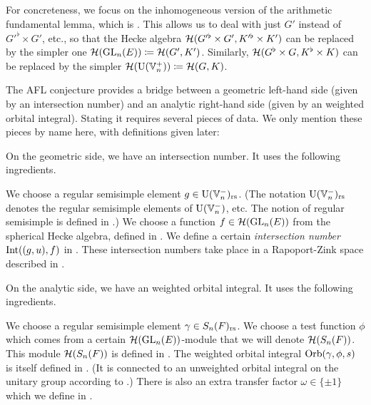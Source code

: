 For concreteness, we focus on the inhomogeneous version
of the arithmetic fundamental lemma, which is \cite[Conjecture 6.2.1]{ref:AFLspherical}.
This allows us to deal with just $G'$ instead of $G'^\flat \times G'$, etc.,
so that the Hecke algebra $\mathcal H(G'^\flat \times G', K'^\flat \times K')$
can be replaced by the simpler one $\mathcal H(\operatorname{GL}_n(E)) \coloneqq \mathcal H(G', K')$.
Similarly, $\mathcal H(G^\flat \times G, K^\flat \times K)$
can be replaced by the simpler $\mathcal H(\operatorname{U}(\mathbb V_n^+)) \coloneqq \mathcal H(G, K)$.

The AFL conjecture provides a bridge between a geometric left-hand side
(given by an intersection number)
and an analytic right-hand side (given by an weighted orbital integral).
Stating it requires several pieces of data.
We only mention these pieces by name here, with definitions given later:
\begin{itemize}
  \ii On the geometric side, we have an intersection number.
  It uses the following ingredients.
  \begin{itemize}
    \ii We choose a regular semisimple element $g \in \operatorname{U}(\mathbb V_n^-)_{\mathrm{rs}}$.
    (The notation $\operatorname{U}(\mathbb V_n^-)_{\mathrm{rs}}$ denotes the regular semisimple elements of $\operatorname{U}(\mathbb V_n^-)$, etc.
    The notion of regular semisimple is defined in .)
    \ii We choose a function $f \in \mathcal H(\operatorname{GL}_n(E))$ from the spherical Hecke algebra,
    defined in .
    \ii We define a certain \emph{intersection number} $\operatorname{Int}((g,u), f)$
    in .
    These intersection numbers take place in a Rapoport-Zink space
    described in .
  \end{itemize}

  \ii On the analytic side, we have an weighted orbital integral.
  It uses the following ingredients.
  \begin{itemize}
    \ii We choose a regular semisimple element $\gamma \in S_n(F)_{\mathrm{rs}}$.
    \ii We choose a test function $\phi$ which comes
    from a certain $\mathcal H(\operatorname{GL}_n(E))$-module that we will denote $\mathcal H(S_n(F))$.
    This module $\mathcal H(S_n(F))$ is defined in .
    \ii The weighted orbital integral $\operatorname{Orb}(\gamma, \phi, s)$
    is itself defined in .
    (It is connected to an unweighted orbital integral on the unitary group
    according to .)
    \ii There is also an extra transfer factor $\omega \in \{\pm1\}$
    which we define in .
  \end{itemize}


\end{itemize}
